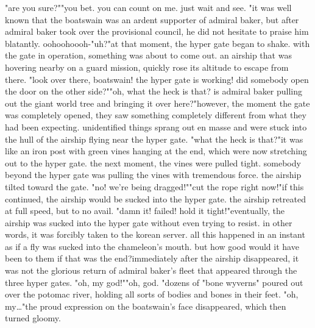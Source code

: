 "are you sure?""you bet.
 you can count on me.
 just wait and see.
"it was well known that the boatswain was an ardent supporter of admiral baker, but after admiral baker took over the provisional council, he did not hesitate to praise him blatantly.
oohoohoooh-"uh?"at that moment, the hyper gate began to shake.
 with the gate in operation, something was about to come out.
 an airship that was hovering nearby on a guard mission, quickly rose its altitude to escape from there.
 "look over there, boatswain! the hyper gate is working! did somebody open the door on the other side?""oh, what the heck is that? is admiral baker pulling out the giant world tree and bringing it over here?"however, the moment the gate was completely opened, they saw something completely different from what they had been expecting.
unidentified things sprang out en masse and were stuck into the hull of the airship flying near the hyper gate.
"what the heck is that?"it was like an iron post with green vines hanging at the end, which were now stretching out to the hyper gate.
the next moment, the vines were pulled tight.
somebody beyond the hyper gate was pulling the vines with tremendous force.
the airship tilted toward the gate.
"no! we're being dragged!""cut the rope right now!"if this continued, the airship would be sucked into the hyper gate.
 the airship retreated at full speed, but to no avail.
"damn it! failed! hold it tight!"eventually, the airship was sucked into the hyper gate without even trying to resist.
 in other words, it was forcibly taken to the korean server.
 all this happened in an instant as if a fly was sucked into the chameleon's mouth.
but how good would it have been to them if that was the end?immediately after the airship disappeared, it was not the glorious return of admiral baker's fleet that appeared through the three hyper gates.
"oh, my god!""oh, god.
"dozens of "bone wyverns" poured out over the potomac river, holding all sorts of bodies and bones in their feet.
"oh, my…"the proud expression on the boatswain's face disappeared, which then turned gloomy.



